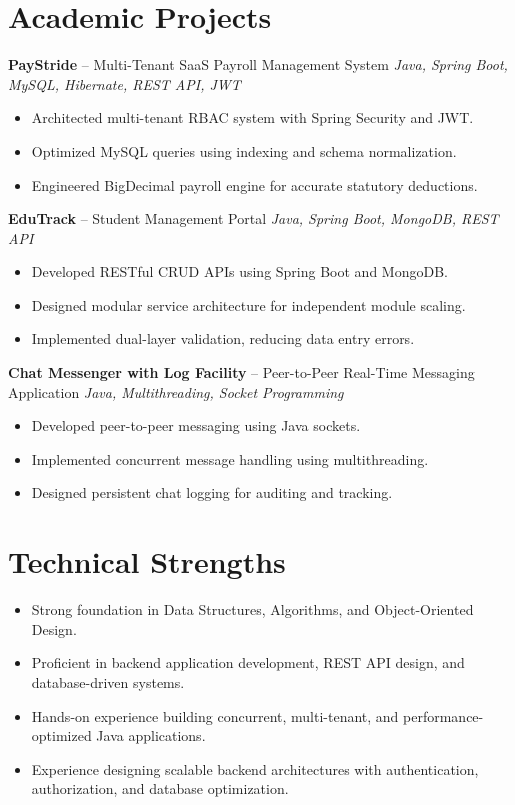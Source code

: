 \documentclass[10.5pt,a4paper]{article}
\begin{document}
\section{Academic Projects}
\textbf{PayStride} -- Multi-Tenant SaaS Payroll Management System \hfill \textit{Java, Spring Boot, MySQL, Hibernate, REST API, JWT}
\begin{itemize}
  \item Architected multi-tenant RBAC system with Spring Security and JWT.
  \item Optimized MySQL queries using indexing and schema normalization.
  \item Engineered BigDecimal payroll engine for accurate statutory deductions.
\end{itemize}
\vspace{4pt}
\textbf{EduTrack} -- Student Management Portal \hfill \textit{Java, Spring Boot, MongoDB, REST API}
\begin{itemize}
  \item Developed RESTful CRUD APIs using Spring Boot and MongoDB.
  \item Designed modular service architecture for independent module scaling.
  \item Implemented dual-layer validation, reducing data entry errors.
\end{itemize}
\vspace{4pt}
\textbf{Chat Messenger with Log Facility} -- Peer-to-Peer Real-Time Messaging Application \hfill \textit{Java, Multithreading, Socket Programming}
\begin{itemize}
  \item Developed peer-to-peer messaging using Java sockets.
  \item Implemented concurrent message handling using multithreading.
  \item Designed persistent chat logging for auditing and tracking.
\end{itemize}
\section{Technical Strengths}
\begin{itemize}
  \item Strong foundation in Data Structures, Algorithms, and Object-Oriented Design.
  \item Proficient in backend application development, REST API design, and database-driven systems.
  \item Hands-on experience building concurrent, multi-tenant, and performance-optimized Java applications.
  \item Experience designing scalable backend architectures with authentication, authorization, and database optimization.
\end{itemize}
\end{document}
